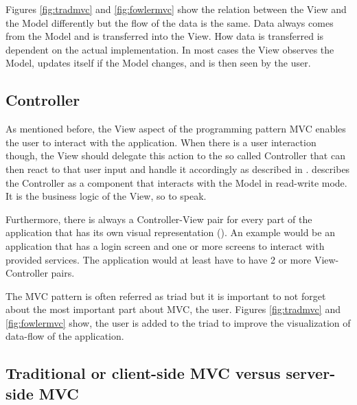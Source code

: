 Figures \ref{fig:tradmvc} and \ref{fig:fowlermvc} show the relation between the View and the Model differently but the flow of the data is the same. Data always comes from the Model and is transferred into the View. How data is transferred is dependent on the actual implementation. In most cases the View observes the Model, updates itself if the Model changes, and is then seen by the user. 

\subsection{Controller}

As mentioned before, the View aspect of the programming pattern MVC enables the user to interact with the application. When there is a user interaction though, the View should delegate this action to the so called Controller that can then react to that user input and handle it accordingly as described in \cite[S.14]{MattiBragge.2013}. \cite[1.4.3. Controller]{stefanoborini.2014} describes the Controller as a component that interacts with the Model in read-write mode. It is the business logic of the View, so to speak. 

Furthermore, there is always a Controller-View pair for every part of the application that has its own visual representation (\cite[\#ModelViewController]{MartinFowler.2006}). An example would be an application that has a login screen and one or more screens to interact with provided services. The application would at least have to have 2 or more View-Controller pairs.

The MVC pattern is often referred as triad but it is important to not forget about the most important part about MVC, the user. Figures \ref{fig:tradmvc} and \ref{fig:fowlermvc} show, the user is added to the triad to improve the visualization of data-flow of the application.

\subsection{Traditional or client-side MVC versus server-side MVC}


